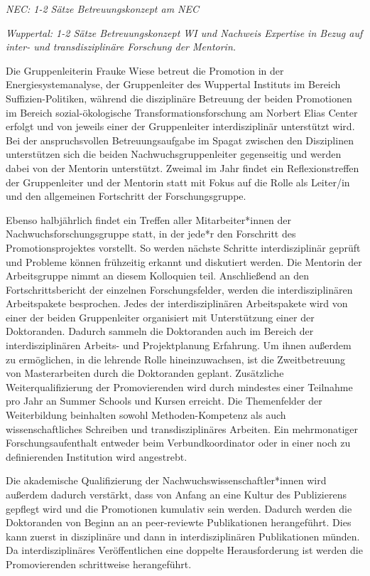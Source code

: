 \documentclass[a4paper,11pt,twoside]{scrartcl}
\begin{document}
\textit{NEC: 1-2 Sätze Betreuungskonzept am NEC}

\textit{Wuppertal: 1-2 Sätze Betreuungskonzept WI und Nachweis Expertise in Bezug auf inter- und transdisziplinäre Forschung der Mentorin.}

Die Gruppenleiterin Frauke Wiese betreut die Promotion in der Energiesystemanalyse, der Gruppenleiter des Wuppertal Instituts im Bereich Suffizien-Politiken, während die disziplinäre Betreuung der beiden Promotionen im Bereich sozial-ökologische Transformationsforschung am Norbert Elias Center erfolgt und von jeweils einer der Gruppenleiter interdisziplinär unterstützt wird. Bei der anspruchsvollen Betreuungsaufgabe im Spagat zwischen den Disziplinen unterstützen sich die beiden Nachwuchsgruppenleiter gegenseitig und werden dabei von der Mentorin unterstützt. Zweimal im Jahr findet ein Reflexionstreffen der Gruppenleiter und der Mentorin statt mit Fokus auf die Rolle als Leiter/in und den allgemeinen Fortschritt der Forschungsgruppe. 

Ebenso halbjährlich findet ein Treffen aller Mitarbeiter*innen der Nachwuchsforschungsgruppe statt, in der jede*r den Forschritt des Promotionsprojektes vorstellt. So werden nächste Schritte interdisziplinär geprüft und Probleme können frühzeitig erkannt und diskutiert werden. Die Mentorin der Arbeitsgruppe nimmt an diesem Kolloquien teil. Anschließend an den Fortschrittsbericht der einzelnen Forschungsfelder, werden die interdisziplinären Arbeitspakete besprochen. Jedes der interdisziplinären Arbeitspakete wird von einer der beiden Gruppenleiter organisiert mit Unterstützung einer der Doktoranden. Dadurch sammeln die Doktoranden auch im Bereich der interdisziplinären Arbeits- und Projektplanung Erfahrung. Um ihnen außerdem zu ermöglichen, in die lehrende Rolle hineinzuwachsen, ist die Zweitbetreuung von Masterarbeiten durch die Doktoranden geplant. Zusätzliche Weiterqualifizierung der Promovierenden wird durch mindestes einer Teilnahme pro Jahr an Summer Schools und Kursen erreicht. Die Themenfelder der Weiterbildung beinhalten sowohl Methoden-Kompetenz als auch wissenschaftliches Schreiben und transdisziplinäres Arbeiten. Ein mehrmonatiger Forschungsaufenthalt entweder beim Verbundkoordinator oder in einer noch zu definierenden Institution wird angestrebt.


Die akademische Qualifizierung der Nachwuchswissenschaftler*innen wird außerdem dadurch verstärkt, dass von Anfang an eine Kultur des Publizierens gepflegt wird und die Promotionen kumulativ sein werden. Dadurch werden die Doktoranden von Beginn an an peer-reviewte Publikationen herangeführt. Dies kann zuerst in disziplinäre und dann in interdisziplinären Publikationen münden. Da interdisziplinäres Veröffentlichen eine doppelte Herausforderung ist werden die Promovierenden schrittweise herangeführt.
\end{document}
